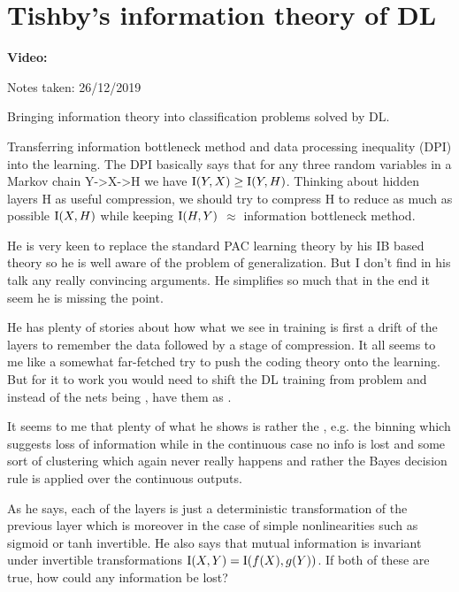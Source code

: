 \clearpage

\section{Tishby's information theory of DL}\label{sec:infoDL:_Tisby}

\begin{notebox}
\textbf{Video: } 

\hfill Notes taken: 26/12/2019 
\end{notebox}

Bringing information theory into classification problems solved by DL.

Transferring information bottleneck method and data processing inequality (DPI) into the learning. The DPI basically says that for any three random variables in a Markov chain Y->X->H we have $\mathrm{I}(Y, X) \geq \mathrm{I}(Y, H)$. Thinking about hidden layers H as useful compression, we should try to compress H to reduce as much as possible $\mathrm{I}(X,H)$ while keeping $\mathrm{I}(H,Y)$ $\approx$ information bottleneck method.

He is very keen to replace the standard PAC learning theory by his IB based theory so he is well aware of the problem of generalization. But I don't find in his talk any really convincing arguments. He simplifies so much that in the end it seem he is missing the point.

He has plenty of stories about how what we see in training is first a drift of the layers to remember the data followed by a stage of compression. It all seems to me like a somewhat far-fetched try to push the coding theory onto the learning. But for it to work you would need to shift the DL training from  problem and instead of the nets being , have them as .

It seems to me that plenty of what he shows is rather the , e.g. the binning which suggests loss of information while in the continuous case no info is lost and some sort of clustering which again never really happens and rather the Bayes decision rule is applied over the continuous outputs.

 As he says, each of the layers is just a deterministic transformation of the previous layer which is moreover in the case of simple nonlinearities such as sigmoid or tanh invertible. He also says that mutual information is invariant under invertible transformations $\mathrm{I}(X, Y) = \mathrm{I}(f(X), g(Y))$. If both of these are true, how could any information be lost?

